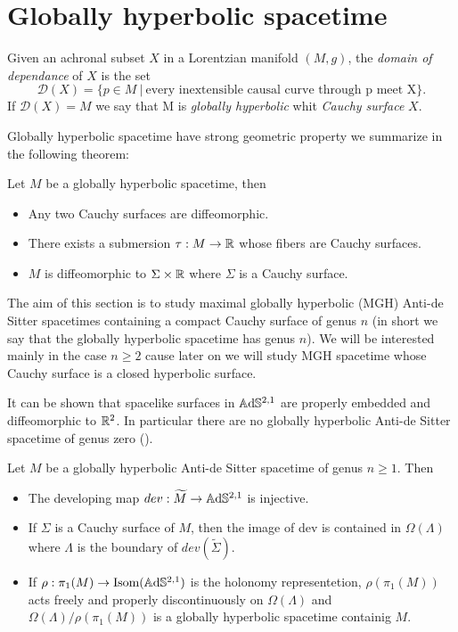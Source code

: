 \section{Globally hyperbolic spacetime}
\begin{definition}
    Given an achronal subset $X$ in a Lorentzian manifold $(M,g)$, the \textit{domain of dependance} of $X$ is the set
    \[
        \mathcal{D}(X)= \{ p \in M \ | \ \text{every inextensible causal curve through p meet X} \}.
    \]
    If $\mathcal{D}(X)=M$ we say that M is  \textit{globally hyperbolic} whit \textit{Cauchy surface} $X$.
\end{definition}
Globally hyperbolic spacetime have strong geometric property we summarize in the following theorem:
\begin{theorem}
    Let $M$ be a globally hyperbolic spacetime, then
    \begin{itemize}
        \item Any two Cauchy surfaces are diffeomorphic.
        \item There  exists a submersion $\tau : M \to \mathbb{R}$ whose fibers are Cauchy surfaces.
        \item $M$ is diffeomorphic to $\Sigma \times \mathbb{R}$ where $\Sigma$ is a Cauchy surface.
    \end{itemize}
\end{theorem}
The aim of this section is to study maximal globally hyperbolic (MGH) Anti-de Sitter spacetimes containing a compact Cauchy surface of genus $n$ (in short we say that the globally hyperbolic spacetime has genus $n$). We will be interested mainly in the case $n\geq 2$ cause later on we will study MGH spacetime whose Cauchy surface is a closed hyperbolic surface.\\ 
\begin{observation}
    It can be shown that spacelike surfaces in $\mathbb{A}\mathrm{d}\mathbb{S}^{2,1}$ are properly embedded and diffeomorphic to $\mathbb{R}^2$.
    In particular there are no globally hyperbolic Anti-de Sitter spacetime of genus zero (\cite{bonsanteseppi}).
\end{observation}
\begin{proposition}\label{prop:GH_geometry}
    Let $M$ be a globally hyperbolic Anti-de Sitter spacetime of genus $n\geq 1$. Then
    \begin{itemize}
        \item The developing map $dev: \widetilde{M} \to\mathbb{A}\mathrm{d}\mathbb{S}^{2,1}$ is injective.
        \item If $\Sigma$ is a Cauchy surface of $M$, then the image of dev is contained in $\Omega(\Lambda)$ where $\Lambda$ is the boundary of $dev(\widetilde{\Sigma})$.
        \item If $\rho : \pi_1(M) \to \text{Isom}(\mathbb{A}\mathrm{d}\mathbb{S}^{2,1})$ is the holonomy representetion, $\rho(\pi_1(M))$ acts freely and properly discontinuously on $\Omega(\Lambda)$ and $\Omega(\Lambda) / \rho(\pi_1(M))$ is a globally hyperbolic spacetime containig $M$.
    \end{itemize}
\end{proposition}
